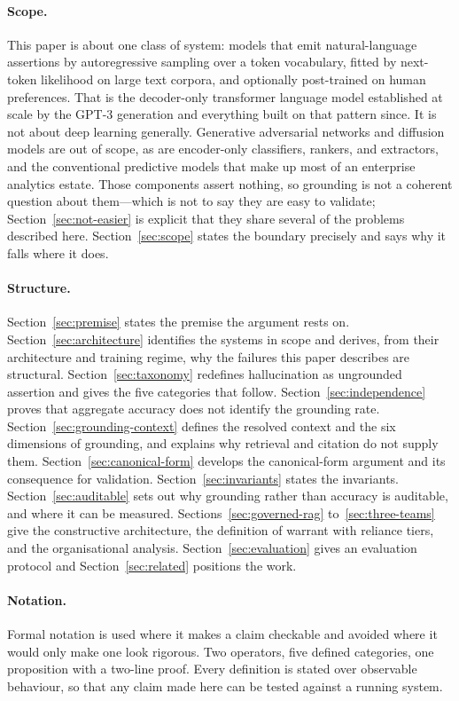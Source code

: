 \paragraph{Scope.} This paper is about one class of system: models that emit
natural-language assertions by autoregressive sampling over a token vocabulary,
fitted by next-token likelihood on large text corpora, and optionally post-trained
on human preferences. That is the decoder-only transformer language model
established at scale by the GPT-3 generation and everything built on that pattern
since. It is not about deep learning generally. Generative adversarial networks and
diffusion models are out of scope, as are encoder-only classifiers, rankers, and
extractors, and the conventional predictive models that make up most of an
enterprise analytics estate. Those components assert nothing, so grounding is not a
coherent question about them---which is not to say they are easy to validate;
Section~\ref{sec:not-easier} is explicit that they share several of the problems
described here. Section~\ref{sec:scope} states the boundary
precisely and says why it falls where it does.

\paragraph{Structure.} Section~\ref{sec:premise} states the premise the argument
rests on. Section~\ref{sec:architecture} identifies the systems in scope and
derives, from their architecture and training regime, why the failures this paper
describes are structural. Section~\ref{sec:taxonomy} redefines
hallucination as ungrounded assertion and gives the five categories that follow.
Section~\ref{sec:independence} proves that aggregate accuracy does not identify the
grounding rate.
Section~\ref{sec:grounding-context} defines the resolved context and the six
dimensions of grounding, and explains why retrieval and citation do not supply
them. Section~\ref{sec:canonical-form} develops the canonical-form argument and its
consequence for validation. Section~\ref{sec:invariants} states the invariants.
Section~\ref{sec:auditable} sets out why grounding rather than accuracy is
auditable, and where it can be measured. Sections~\ref{sec:governed-rag}
to~\ref{sec:three-teams} give the constructive architecture, the definition of
warrant with reliance tiers, and the organisational analysis.
Section~\ref{sec:evaluation} gives an evaluation protocol and
Section~\ref{sec:related} positions the work.

\paragraph{Notation.} Formal notation is used where it makes a claim checkable
and avoided where it would only make one look rigorous. Two operators, five
defined categories, one proposition with a two-line proof. Every definition is
stated over observable behaviour, so that any claim made here can be tested
against a running system.
